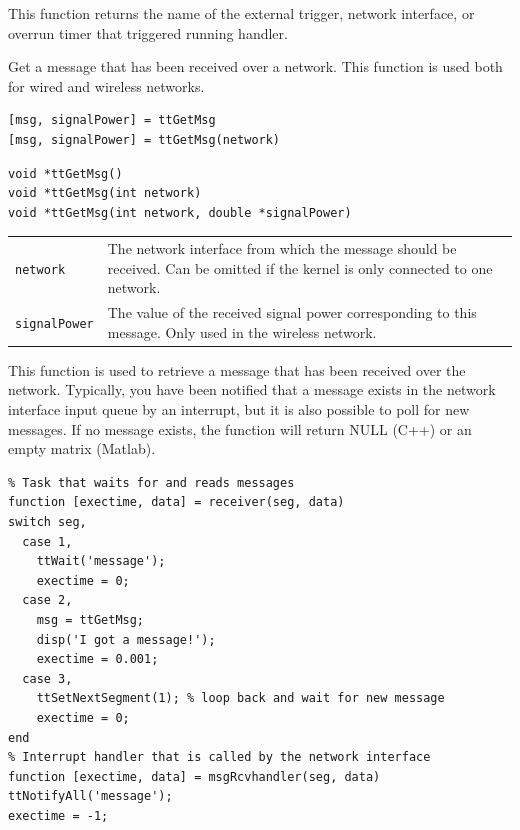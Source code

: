 \documentclass[final,twoside]{rapport}
\begin{document}
\descr This function returns the name of the external trigger, network
interface, or overrun timer that triggered running handler.



\purpose
Get a message that has been received over a network. This function is
used both for wired and wireless networks.

\Msyntax
\begin{verbatim}
[msg, signalPower] = ttGetMsg
[msg, signalPower] = ttGetMsg(network)
\end{verbatim}


\Csyntax
\begin{verbatim}
void *ttGetMsg()
void *ttGetMsg(int network)
void *ttGetMsg(int network, double *signalPower)
\end{verbatim}


\args
\begin{tabularx}{\hsize}{l>{\raggedright\arraybackslash}X}
  {\tt network} & The network interface from which the message should be
  received. Can be omitted if the kernel is only connected to one network. \\
  {\tt signalPower} & The value of the received signal power
  corresponding to this message. Only used in the wireless network.\\
\end{tabularx}

\descr This function is used to retrieve a message that has been
received over the network. Typically, you have been notified that a
message exists in the network interface input queue by an interrupt,
but it is also possible to poll for new messages. If no message
exists, the function will return NULL (C++) or an empty matrix
(Matlab). 

\example
\begin{small}
\begin{verbatim}
% Task that waits for and reads messages 
function [exectime, data] = receiver(seg, data)
switch seg,
  case 1, 
    ttWait('message');
    exectime = 0;
  case 2,
    msg = ttGetMsg;
    disp('I got a message!');
    exectime = 0.001;
  case 3,
    ttSetNextSegment(1); % loop back and wait for new message
    exectime = 0;
end
% Interrupt handler that is called by the network interface 
function [exectime, data] = msgRcvhandler(seg, data)
ttNotifyAll('message');
exectime = -1;
\end{verbatim}
\end{small}
\end{document}
